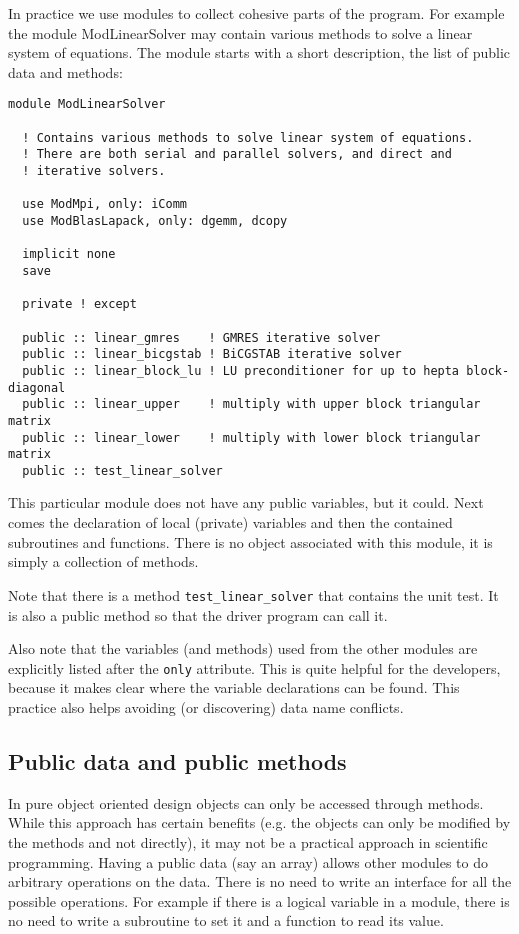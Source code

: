 \documentclass{article}
\begin{document}
In practice we use modules to collect cohesive parts of the program. 
For example the module ModLinearSolver may contain various methods to 
solve a linear system of equations. The module starts with a short 
description, the list of public data and methods:
\begin{verbatim}
module ModLinearSolver

  ! Contains various methods to solve linear system of equations.
  ! There are both serial and parallel solvers, and direct and 
  ! iterative solvers.

  use ModMpi, only: iComm
  use ModBlasLapack, only: dgemm, dcopy

  implicit none
  save

  private ! except

  public :: linear_gmres    ! GMRES iterative solver
  public :: linear_bicgstab ! BiCGSTAB iterative solver
  public :: linear_block_lu ! LU preconditioner for up to hepta block-diagonal 
  public :: linear_upper    ! multiply with upper block triangular matrix
  public :: linear_lower    ! multiply with lower block triangular matrix
  public :: test_linear_solver
\end{verbatim}
This particular module does not have any public variables, but it could.
Next comes the declaration of local (private) variables and then the 
contained subroutines and functions. There is no object associated with
this module, it is simply a collection of methods. 

Note that there is a method {\tt test\_linear\_solver} that contains the
unit test. It is also a public method so that the driver program can call it.

Also note that the variables (and methods) used from the other modules are 
explicitly listed after the {\tt only} attribute. 
This is quite helpful for the developers, because it makes clear where 
the variable declarations can be found. This practice also helps avoiding 
(or discovering) data name conflicts.

\subsection{Public data and public methods}

In pure object oriented design objects can only be accessed through methods.
While this approach has certain benefits (e.g. the objects can only be modified
by the methods and not directly), it may not be a practical approach in 
scientific programming. Having a public data (say an array) allows other
modules to do arbitrary operations on the data. There is no need to write
an interface for all the possible operations. For example if there is a logical
variable in a module, there is no need to write a subroutine to set it and
a function to read its value. 
\end{document}
